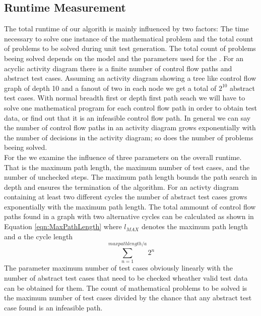 \subsection{Runtime Measurement}
The total runtime of our algorith is mainly influenced by two factors: The time necessary to solve one instance of the mathematical problem and the total count of problems to be solved during unit test generation. The total count of problems beeing solved depends on the model and the parameters used for the . For an acyclic activity diagram there is a finite number of control flow paths and abstract test cases. Assuming an activity diagram showing a tree like control flow graph of depth 10 and a fanout of two in each node we get a total of $2^{10}$ abstract test cases. With normal breadth first or depth first path seach we will have to solve one mathematical program for each control flow path in order to obtain test data, or find out that it is an infeasible control flow path. In general we can say the number of control flow paths in an activity diagram grows exponentially with the number of decisions in the activity diagram; so does the number of problems beeing solved.\\
For the  we examine the influence of three parameters on the overall runtime. That is the maximum path length, the maximum number of test cases, and the number of unchecked steps. The maximum path length bounds the path search in depth and ensures the termination of the algorithm. For an activty diagram containing at least two different cycles the number of abstract test cases grows exponentially with the maximum path length. %
The total ammount of control flow paths found in a graph with two alternative cycles can be calculated as shown in Equation \ref{eqn:MaxPathLength} where $l_{MAX}$ denotes the maximum path length and $a$ the cycle length
\begin{equation}\sum_{n=1}^{max path length/a}{2^n}\label{eqn:MaxPathLength}\end{equation}
The parameter maximum number of test cases obviously linearly with the number of abstract test cases that need to be checked wheather valid test data can be obtained for them. The count of mathematical problems to be solved is the maximum number of test cases divided by the chance that any abstract test case found is an infeasible path. 
